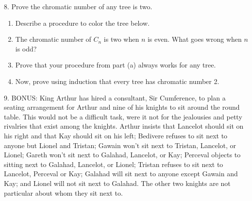 \documentclass[10pt,]{book}
\theoremstyle{plain}
\theoremstyle{definition}
\theoremstyle{definition}
\theoremstyle{definition}
\numberwithin{equation}{chapter}
\newcommand{\vtx}[2]{node[fill,circle,inner sep=0pt, minimum size=4pt,label=#1:#2]{}}
\renewcommand{\v}{\vtx{above}{}}
\begin{document}
\begin{exerciselist}
\begin{enumerate}[label=(\alph*)]
\end{enumerate}
\par\smallskip
\item[8.]\hypertarget{exercise-320}{}
            Prove the chromatic number of any tree is two.
\leavevmode%
\begin{enumerate}[label=(\alph*)]
\item\hypertarget{li-1314}{}
                Describe a procedure to color the tree below.
                \leavevmode%
\begin{figure}
\centering
{
}
\end{figure}


\item\hypertarget{li-1315}{}
                The chromatic number of \(C_n\) is two when \(n\) is even. What goes wrong when \(n\) is odd?
\item\hypertarget{li-1316}{}
                Prove that your procedure from part (a) always works for any tree.


\item\hypertarget{li-1317}{}
                Now, prove using induction that every tree has chromatic number 2.


\end{enumerate}
\par\smallskip
\item[9.]\hypertarget{exercise-321}{}
            BONUS: King Arthur has hired a consultant, Sir Cumference, to plan a seating arrangement for Arthur and nine of his knights to sit around the round table. This would not be a difficult task, were it not for the jealousies and petty rivalries that exist among the knights. Arthur insists that Lancelot should sit on his right and that Kay should sit on his left; Bedivere refuses to sit next to anyone but Lionel and Tristan; Gawain won't sit next to Tristan, Lancelot, or Lionel; Gareth won't sit next to Galahad, Lancelot, or Kay; Perceval objects to sitting next to Galahad, Lancelot, or Lionel; Tristan refuses to sit next to Lancelot, Perceval or Kay; Galahad will sit next to anyone except Gawain and Kay; and Lionel will not sit next to Galahad. The other two knights are not particular about whom they sit next to.
\par


\end{exerciselist}
\end{document}
